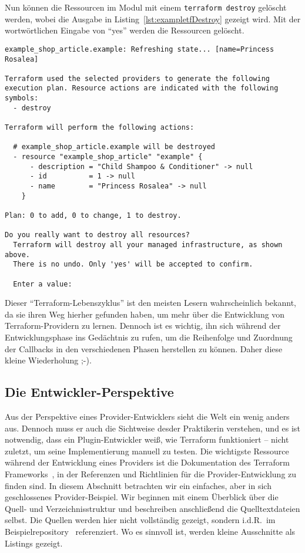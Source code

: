 \documentclass[paper=a4,11pt,numbers=noenddot]{article}
\begin{document}
Nun können die Ressourcen im Modul mit einem \verb'terraform destroy' gelöscht werden, wobei die Ausgabe in Listing~\ref{lst:exampletfDestroy} gezeigt wird. Mit der wortwörtlichen Eingabe von ``yes'' werden die Ressourcen gelöscht.

\begin{lstlisting}[label=lst:exampletfDestroy]
example_shop_article.example: Refreshing state... [name=Princess Rosalea]

Terraform used the selected providers to generate the following execution plan. Resource actions are indicated with the following symbols:
  - destroy

Terraform will perform the following actions:

  # example_shop_article.example will be destroyed
  - resource "example_shop_article" "example" {
      - description = "Child Shampoo & Conditioner" -> null
      - id          = 1 -> null
      - name        = "Princess Rosalea" -> null
    }

Plan: 0 to add, 0 to change, 1 to destroy.

Do you really want to destroy all resources?
  Terraform will destroy all your managed infrastructure, as shown above.
  There is no undo. Only 'yes' will be accepted to confirm.

  Enter a value:
\end{lstlisting}

Dieser ``Terraform-Lebenszyklus'' ist den meisten Lesern wahrscheinlich bekannt, da sie ihren Weg hierher gefunden haben, um mehr über die Entwicklung von Terraform-Providern zu lernen. Dennoch ist es wichtig, ihn sich während der Entwicklungsphase ins Gedächtnis zu rufen, um die Reihenfolge und Zuordnung der Callbacks in den verschiedenen Phasen herstellen zu können. Daher diese kleine Wiederholung ;-).

\subsection{Die Entwickler-Perspektive}
\label{subsec:developers-view}

Aus der Perspektive eines Provider-Entwicklers sieht die Welt ein wenig anders aus. Dennoch muss er auch die Sichtweise desder Praktikerin verstehen, und es ist notwendig, dass ein Plugin-Entwickler weiß, wie Terraform funktioniert – nicht zuletzt, um seine Implementierung manuell zu testen. Die wichtigste Ressource während der Entwicklung eines Providers ist die Dokumentation des Terraform Frameworks~\autocite{noauthor_terraform_framework_nodate}, in der Referenzen und Richtlinien für die Provider-Entwicklung zu finden sind. In diesem Abschnitt betrachten wir ein einfaches, aber in sich geschlossenes Provider-Beispiel. Wir beginnen mit einem Überblick über die Quell- und Verzeichnisstruktur und beschreiben anschließend die Quelltextdateien selbst. Die Quellen werden hier nicht vollständig gezeigt, sondern i.d.R.\ im Beispielrepository~\autocite{ecky-l_terraform-provider-example_nodate} referenziert. Wo es sinnvoll ist, werden kleine Ausschnitte als Listings gezeigt.
\end{document}
